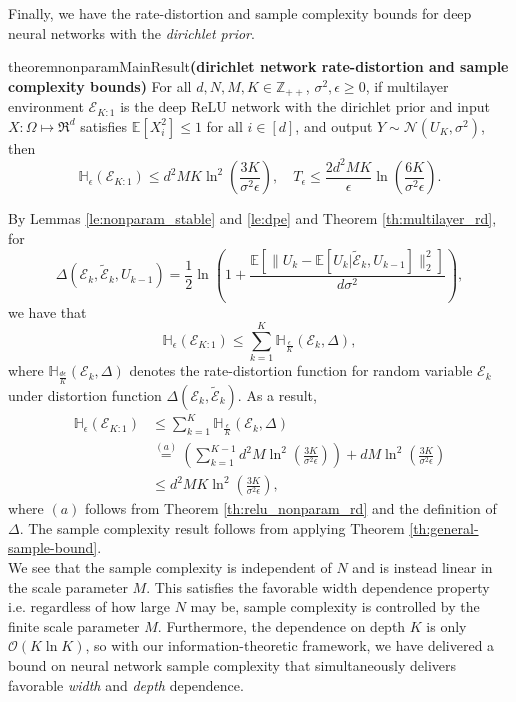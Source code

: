 \documentclass[twoside,11pt]{article}
\renewenvironment{proof}{\par\noindent{\bf Proof\ }}{\hfill\BlackBox\\[2mm]}
\newenvironment{proof}{\par\noindent{\bf Proof\ }}{\hfill\BlackBox\\[2mm]}
\def\environment{\mathcal{E}}
\def\proxy{\tilde{\environment}}
\def\normal{\mathcal{N}}
\def\E{\mathbb{E}}
\def\H{\mathbb{H}}
\begin{document}
Finally, we have the rate-distortion and sample complexity bounds for deep neural networks with the \emph{dirichlet prior}.
\begin{restatable}{theorem}{nonparamMainResult}{\bf (dirichlet network rate-distortion and sample complexity bounds)}
    For all $d, N, M, K\in\mathbb{Z}_{++}$, $\sigma^2, \epsilon \geq 0$, if multilayer environment $\environment_{K:1}$ is the deep ReLU network with the dirichlet prior and input $X:\Omega\mapsto\Re^d$ satisfies $\E\left[X_i^2\right] \leq 1$ for all $i\in[d]$, and output $Y\sim\normal(U_K, \sigma^2)$, then
    $$\H_{\epsilon}(\environment_{K:1}) \leq d^2MK\ln^2\left(\frac{3K}{\sigma^2\epsilon}\right),\quad T_\epsilon \leq \frac{2d^2MK}{\epsilon}\ln\left(\frac{6K}{\sigma^2\epsilon}\right).$$
\end{restatable}
\begin{proof}
    By Lemmas \ref{le:nonparam_stable} and \ref{le:dpe} and Theorem \ref{th:multilayer_rd}, for 
    $$\Delta(\environment_k, \proxy_k, U_{k-1}) = \frac{1}{2}\ln\left(1 + \frac{\E[\|U_k - \E[U_k|\proxy_k, U_{k-1}]\|^2_2]}{d\sigma^2}\right),$$
    we have that
    $$\H_\epsilon(\environment_{K:1}) \leq \sum_{k=1}^{K} \H_{\frac{\epsilon}{K}}(\environment_k, \Delta),$$
    where $\H_{\frac{d\epsilon}{K}}(\environment_k, \Delta)$ denotes the rate-distortion function for random variable $\environment_k$ under distortion function $\Delta(\environment_k,\proxy_k)$. As a result,
    \begin{align*}
        \H_\epsilon(\environment_{K:1})
        & \leq \sum_{k=1}^{K}\H_{\frac{\epsilon}{K}}(\environment_k, \Delta)\\
        & \overset{(a)}{=} \left(\sum_{k=1}^{K-1} d^2M\ln^2\left(\frac{3K}{\sigma^2\epsilon}\right)\right) + dM\ln^2\left(\frac{3K}{\sigma^2\epsilon}\right)\\
        & \leq d^2MK\ln^2\left(\frac{3K}{\sigma^2\epsilon}\right),
    \end{align*}
    where $(a)$ follows from Theorem \ref{th:relu_nonparam_rd} and the definition of $\Delta$.
    The sample complexity result follows from applying Theorem \ref{th:general-sample-bound}.
\end{proof}
We see that the sample complexity is independent of $N$ and is instead linear in the scale parameter $M$. This satisfies the favorable width dependence property i.e. regardless of how large $N$ may be, sample complexity is controlled by the finite scale parameter $M$. Furthermore, the dependence on depth $K$ is only $\mathcal{O}(K\ln K)$, so with our information-theoretic framework, we have delivered a bound on neural network sample complexity that simultaneously delivers favorable \emph{width} and \emph{depth} dependence.
\end{document}
